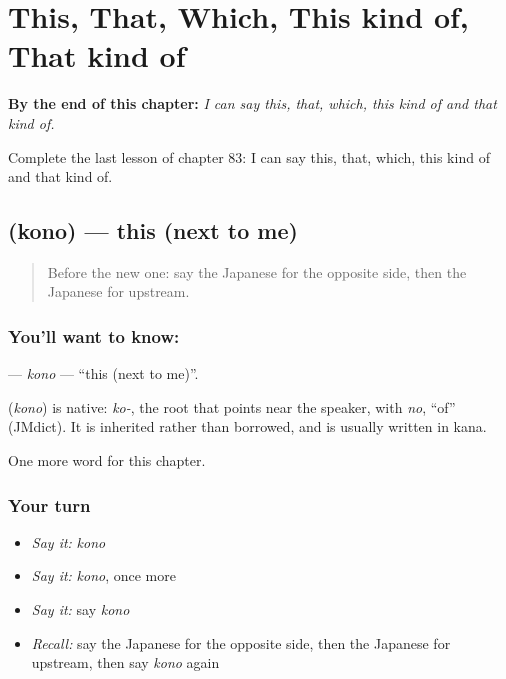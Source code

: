 
\chapter{This, That, Which, This kind of, That kind of}
\label{ch:ja-this-that-which-this-kind-of-that-kind-of}

\begin{chapteropening}
\textbf{By the end of this chapter:} \emph{I can say this, that, which, this kind of and that kind of.}

Complete the last lesson of chapter 83: I can say this, that, which, this kind of and that kind of.
\end{chapteropening}

\section[\texorpdfstring{\ja{この} (kono)}{この (kono)}]{ (kono) — this (next to me)}

\label{lesson:JA-C83-kono}



\begin{quote}
Before the new one: say the Japanese for the opposite side, then the Japanese for upstream.
\end{quote}

\subsection*{You'll want to know: }
\textbf{} — \emph{kono} — \textquotedblleft{}this (next to me)\textquotedblright{}.

\begin{cousinweb}
\textbf{} (\emph{kono}) is native: \emph{ko-}, the root that points near the speaker, with \emph{no}, \textquotedblleft{}of\textquotedblright{} (JMdict). It is inherited rather than borrowed, and is usually written in kana.
\end{cousinweb}

\begin{grammarlens}[title={What you've built}]
One more word for this chapter.
\end{grammarlens}

\subsection*{Your turn}
\begin{itemize}
\raggedright
  \item \emph{Say it:} \emph{kono}
  \item \emph{Say it:} \emph{kono}, once more
  \item \emph{Say it:} say \emph{kono}
  \item \emph{Recall:} say the Japanese for the opposite side, then the Japanese for upstream, then say \emph{kono} again
\end{itemize}

